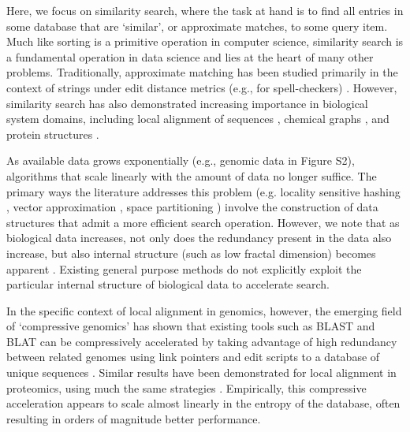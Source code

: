 \documentclass[review,preprint,12pt]{elsarticle}
\renewcommand{\cite}{\citep} %
\theoremstyle{definition}
\theoremstyle{remark}
\numberwithin{equation}{section}
\begin{document}
Here, we focus on similarity search, where the task at hand is to find all entries in some database that are `similar', or approximate matches, to some query item.
Much like sorting is a primitive operation in computer science, similarity search is a fundamental operation in data science and lies at the heart of many other problems.
Traditionally, approximate matching has been studied primarily in the context of strings under edit distance metrics (e.g., for spell-checkers) \cite{ukkonen1985algorithms}.
However, similarity search has also demonstrated increasing importance in biological system domains, including local alignment of sequences \cite{altschul1990basic, kent2002blat}, chemical graphs \cite{schaeffer2007graph}, and protein structures \cite{budowski2010fragbag}.

As available data grows exponentially \cite{berger2013computational,yu2015quality} (e.g., genomic data in Figure S2), 
algorithms that scale linearly with the amount of data no longer suffice.
The primary ways the literature addresses this problem (e.g.
locality sensitive hashing \cite{indyk1998approximate}, vector approximation \cite{ferhatosmanoglu2000vector}, space partitioning \cite{weber1998quantitative}) involve the construction of data structures that admit a more efficient search operation.
However, we note that as biological data increases, not only does the redundancy present in the data also increase, but also internal structure (such as low fractal dimension) becomes apparent \cite{loh2012compressive}.
Existing general purpose methods do not explicitly exploit the particular internal structure of biological data to accelerate search.

In the specific context of local alignment in genomics, however, the emerging field of `compressive genomics' has shown that existing tools such as BLAST and BLAT can be compressively accelerated by taking advantage of high redundancy between related genomes using link pointers and edit scripts to a database of unique sequences \cite{loh2012compressive}.
Similar results have been demonstrated for local alignment in proteomics, using much the same strategies \cite{daniels2013compressive}.
Empirically, this compressive acceleration appears to scale almost linearly in the entropy of the database, often resulting in orders of magnitude better performance.
\end{document}

